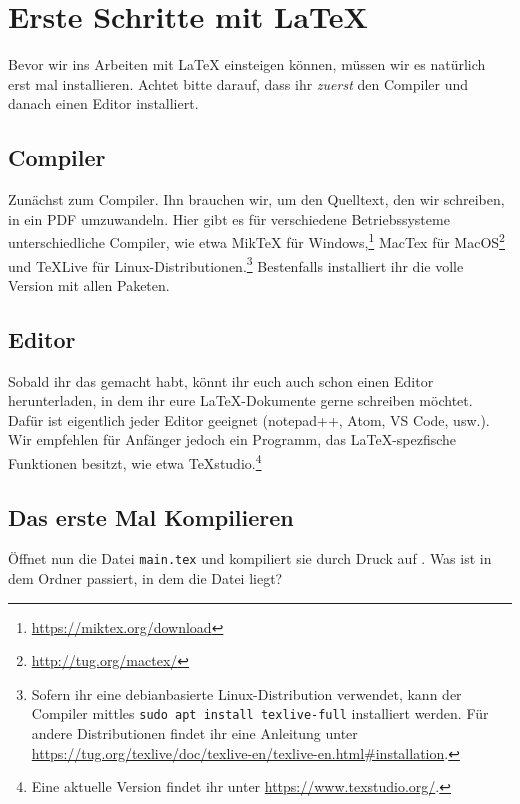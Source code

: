 \chapter*{Erste Schritte mit \LaTeX}
Bevor wir ins Arbeiten mit \LaTeX{} einsteigen können, müssen wir es natürlich erst mal installieren. Achtet bitte darauf, dass ihr \emph{zuerst} den Compiler und danach einen Editor installiert.

\section*{Compiler}
Zunächst zum Compiler. Ihn brauchen wir, um den Quelltext, den wir schreiben, in ein PDF umzuwandeln. Hier gibt es für verschiedene Betriebssysteme unterschiedliche Compiler, wie etwa MikTeX für Windows,\footnote{\url{https://miktex.org/download}} MacTex für MacOS\footnote{\url{http://tug.org/mactex/}} und TeXLive für Linux-Distributionen.\footnote{Sofern ihr eine debianbasierte Linux-Distribution verwendet, kann der Compiler mittles \texttt{sudo apt install texlive-full} installiert werden. Für andere Distributionen findet ihr eine Anleitung unter \url{https://tug.org/texlive/doc/texlive-en/texlive-en.html\#installation}.} Bestenfalls installiert ihr die volle Version mit allen Paketen.

\section*{Editor}
Sobald ihr das gemacht habt, könnt ihr euch auch schon einen Editor herunterladen, in dem ihr eure \LaTeX-Dokumente gerne schreiben möchtet. Dafür ist eigentlich jeder Editor geeignet (notepad++, Atom, VS Code, usw.). Wir empfehlen für Anfänger jedoch ein Programm, das \LaTeX-spezfische Funktionen besitzt, wie etwa TeXstudio.\footnote{Eine aktuelle Version findet ihr unter \url{https://www.texstudio.org/}.}

\section*{Das erste Mal Kompilieren}
Öffnet nun die Datei \texttt{main.tex} und kompiliert sie durch Druck auf \faForward. Was ist in dem Ordner passiert, in dem die Datei liegt?

